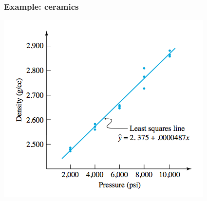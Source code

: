 \documentclass[handout]{beamer}\usepackage[]{graphicx}\usepackage[]{color}
\numberwithin{equation}{section}
\begin{document}
\begin{frame}
\frametitle{Example: ceramics}
 \includegraphics{../../fig/ceramicsplot.png}
\end{frame}
\end{document}
